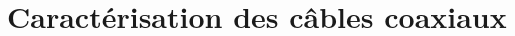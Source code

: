 \documentclass[8pt,a9paper]{beamer} \usepackage[utf8]{inputenc} \usepackage[francais]{babel} \usepackage[T1]{fontenc}
\begin{document}
\section{Caractérisation des câbles coaxiaux}
\begin{frame}
\begin{columns}
\begin{column}{0.7\textwidth}
    \begin{description}
        \item[]~\\
    \end{description}
\end{column}
\begin{column}{0.3\textwidth}
\begin{figure}[h]
    \begin{center}
    \end{center}
\end{figure}
\end{column}
\end{columns}
\end{frame}
\end{document}
